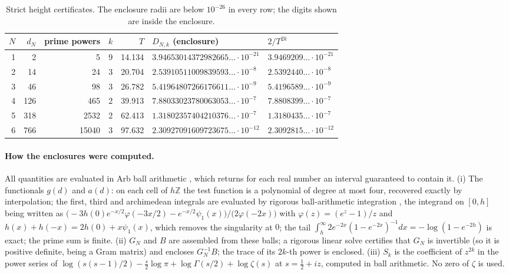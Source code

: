 \documentclass[11pt,a4paper]{article}
\theoremstyle{plain}
\theoremstyle{remark}
\begin{document}
\begin{table}[ht]
\centering\small
\begin{tabular}{@{}rrrrrll@{}}
\toprule
$N$&$d_N$&prime powers&$k$&$T$&$D_{N,k}$ (enclosure)&$2/T^{2k}$\\\midrule
1&2&5&9&14.134&$3.94653014372982665\ldots\cdot10^{-21}$&$3.9469209\ldots\cdot10^{-21}$\\
2&14&24&3&20.704&$2.53910511009839593\ldots\cdot10^{-8}$&$2.5392440\ldots\cdot10^{-8}$\\
3&46&98&3&26.782&$5.41964807266176611\ldots\cdot10^{-9}$&$5.4196589\ldots\cdot10^{-9}$\\
4&126&465&2&39.913&$7.88033023780063053\ldots\cdot10^{-7}$&$7.8808399\ldots\cdot10^{-7}$\\
5&318&2532&2&62.413&$1.31802357404210376\ldots\cdot10^{-7}$&$1.3180435\ldots\cdot10^{-7}$\\
6&766&15040&3&97.632&$2.30927091609723675\ldots\cdot10^{-12}$&$2.3092815\ldots\cdot10^{-12}$\\\bottomrule
\end{tabular}
\caption{Strict height certificates. The enclosure radii are below $10^{-26}$ in every row; the digits shown are
inside the enclosure.}\label{tab:cert}
\end{table}

\paragraph{How the enclosures were computed.}
All quantities are evaluated in Arb ball arithmetic \cite{arb}, which returns for each real number an interval
guaranteed to contain it. (i) The functionals $g(d)$ and $a(d)$: on each cell of $h\mathbb Z$ the test function is a
polynomial of degree at most four, recovered exactly by interpolation; the first, third and archimedean integrals are
evaluated by rigorous ball-arithmetic integration \cite{arb-int}, the integrand on $[0,h]$ being written as
$\bigl(-3h(0)e^{-x/2}\varphi(-3x/2)-e^{-x/2}\psi_1(x)\bigr)/\bigl(2\varphi(-2x)\bigr)$ with $\varphi(z)=(e^z-1)/z$
and $h(x)+h(-x)=2h(0)+x\psi_1(x)$, which removes the singularity at $0$; the tail $\int_h^\infty
2e^{-2x}(1-e^{-2x})^{-1}dx=-\log(1-e^{-2h})$ is exact; the prime sum is finite. (ii) $G_N$ and $B$ are assembled
from these balls; a rigorous linear solve certifies that $G_N$ is invertible (so it is positive definite, being a
Gram matrix) and encloses $G_N^{-1}B$; the trace of its $2k$-th power is enclosed. (iii) $S_k$ is the coefficient of
$z^{2k}$ in the power series of $\log(s(s-1)/2)-\tfrac s2\log\pi+\log\Gamma(s/2)+\log\zeta(s)$ at $s=\frac12+iz$,
computed in ball arithmetic. No zero of $\zeta$ is used.
\end{document}

